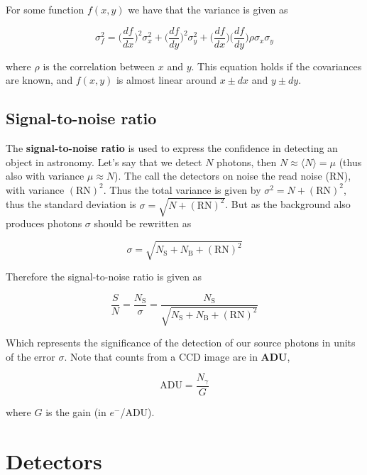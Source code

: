 \documentclass[a4paper]{article}
\begin{document}
For some function $f(x, y)$ we have that the variance is given as

\begin{equation*}
    \sigma_f^2=\bigg(\frac{df}{dx}\bigg)^2\sigma_x^2+\bigg(\frac{df}{dy}\bigg)^2\sigma_y^2+\bigg(\frac{df}{dx}\bigg)\bigg(\frac{df}{dy}\bigg)\rho\sigma_x\sigma_y
\end{equation*}

where $\rho$ is the correlation between $x$ and $y$. This equation holds if the covariances are known, and $f(x, y)$ is almost linear around $x\pm dx$ and $y\pm dy$.

\subsection{Signal-to-noise ratio}

The \textbf{signal-to-noise ratio} is used to express the confidence in detecting an object in astronomy. Let's say that we detect $N$ photons, then $N\approx\langle N \rangle=\mu$ (thus also with variance $\mu\approx N$). The call the detectors on noise the read noise (RN), with variance $(\text{RN})^2$. Thus the total variance is given by $\sigma^2=N+(\text{RN})^2$, thus the standard deviation is $\sigma=\sqrt{N+(\text{RN})^2}$. But as the background also produces photons $\sigma$ should be rewritten as

\begin{equation*}
    \sigma=\sqrt{N_{\text{S}}+N_{\text{B}}+(\text{RN})^2}
\end{equation*}

Therefore the signal-to-noise ratio is given as

\begin{equation*}
    \frac{S}{N}=\frac{N_{\text{S}}}{\sigma}=\frac{N_{\text{S}}}{\sqrt{N_{\text{S}}+N_{\text{B}}+(\text{RN})^2}}
\end{equation*}

Which represents the significance of the detection of our source photons in units of the error $\sigma$. Note that counts from a CCD image are in \textbf{ADU}, 

\begin{equation*}
    \text{ADU}=\frac{N_\gamma}{G}
\end{equation*}

where $G$ is the gain (in $e^{-}$/ADU).

\section{Detectors}
\end{document}
